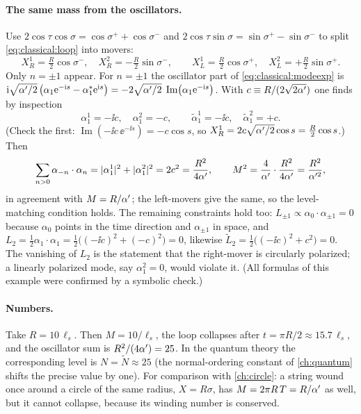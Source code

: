 \paragraph{The same mass from the oscillators.} Use $2\cos\tau\cos\sigma=\cos\sigma^++\cos
\sigma^-$ and $2\cos\tau\sin\sigma=\sin\sigma^+-\sin\sigma^-$ to split
\eqref{eq:classical:loop} into movers:
\[
  X_R^1=\tfrac R2\cos\sigma^-,\quad X_R^2=-\tfrac R2\sin\sigma^-,\qquad
  X_L^1=\tfrac R2\cos\sigma^+,\quad X_L^2=+\tfrac R2\sin\sigma^+ .
\]
Only $n=\pm1$ appear. For $n=\pm1$ the oscillator part of \eqref{eq:classical:modeexp} is
$\mathrm{i}\sqrt{\alpha'/2}\,\big(\alpha_1\mathrm{e}^{-\mathrm{i} s}-\alpha_1^\ast\mathrm{e}^{\mathrm{i} s}\big)
=-2\sqrt{\alpha'/2}\;\operatorname{Im}\!\big(\alpha_1\mathrm{e}^{-\mathrm{i} s}\big)$. With
$c\equiv R/(2\sqrt{2\alpha'})$ one finds by inspection
\begin{equation}\label{eq:classical:loopmodes}
  \alpha_1^1=-\ii c,\quad \alpha_1^2=-c,\qquad \tilde\alpha_1^1=-\ii c,\quad\tilde\alpha_1^2=+c .
\end{equation}
(Check the first: $\operatorname{Im}(-\ii c\,\ee^{-\ii s})=-c\cos s$, so
$X_R^1=2c\sqrt{\alpha'/2}\cos s=\frac R2\cos s$.) Then
\[
  \sum_{n>0}\alpha_{-n}\cdot\alpha_n=|\alpha_1^1|^2+|\alpha_1^2|^2=2c^2=\frac{R^2}{4\alpha'},
  \qquad M^2=\frac4{\alpha'}\cdot\frac{R^2}{4\alpha'}=\frac{R^2}{\alpha'^2},
\]
in agreement with $M=R/\alpha'$; the left-movers give the same, so the level-matching condition
holds. The remaining constraints hold too: $L_{\pm1}\propto\alpha_0\cdot\alpha_{\pm1}=0$
because $\alpha_0$ points in the time direction and $\alpha_{\pm1}$ in space, and
$L_2=\tfrac12\alpha_1\cdot\alpha_1=\tfrac12\big((-\ii c)^2+(-c)^2\big)=0$, likewise $\tilde
L_2=\tfrac12\big((-\ii c)^2+c^2\big)=0$. The vanishing of $L_2$ is the statement that the
right-mover is circularly polarized; a linearly polarized mode, say $\alpha_1^2=0$, would
violate it. (All formulas of this example were confirmed by a symbolic check.)

\paragraph{Numbers.} Take $R=10\,\ell_s$. Then $M=10/\ell_s$, the loop collapses after
$t=\pi R/2\approx15.7\,\ell_s$, and the oscillator sum is $R^2/(4\alpha')=25$. In the quantum theory
the corresponding level is $N=\tilde N\approx25$ (the normal-ordering constant of
\cref{ch:quantum} shifts the precise value by one). For comparison with
\cref{ch:circle}: a string wound once around a circle of the same radius, $X=R\sigma$, has
$M=2\pi R\,T=R/\alpha'$ as well, but it cannot collapse, because its winding number is conserved.

